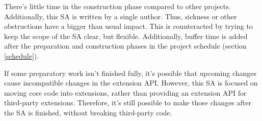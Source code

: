 There's little time in the construction phase compared to other projects.
Additionally, this SA is written by a single author. Thus, sickness or other
obstructions have a bigger than usual impact. This is counteracted by trying to
keep the scope of the SA clear, but flexible. Additionally, buffer time is
added after the preparation and construction phases in the project schedule
(section \ref{schedule}).

If some preparatory work isn't finished fully, it's possible that upcoming
changes cause incompatible changes in the extension API. However, this SA
is focused on moving core code into extensions, rather than providing an
extension API for third-party extensions. Therefore, it's still possible to make
those changes after the SA is finished, without breaking third-party code.